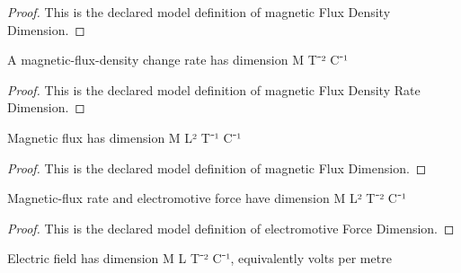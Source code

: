 \begin{proof}
  This is the declared model definition of magnetic Flux Density Dimension.
\end{proof}
\begin{definition}
  \label{def:physics:phyx-mini-0938:phyxminiproblems-problemphyxmini0938-magneticfluxdensityratedimension}
  A magnetic-flux-density change rate has dimension M T⁻² C⁻¹
\end{definition}
\begin{proof}
  This is the declared model definition of magnetic Flux Density Rate Dimension.
\end{proof}
\begin{definition}
  \label{def:physics:phyx-mini-0938:phyxminiproblems-problemphyxmini0938-magneticfluxdimension}
  Magnetic flux has dimension M L² T⁻¹ C⁻¹
\end{definition}
\begin{proof}
  This is the declared model definition of magnetic Flux Dimension.
\end{proof}
\begin{definition}
  \label{def:physics:phyx-mini-0938:phyxminiproblems-problemphyxmini0938-electromotiveforcedimension}
  Magnetic-flux rate and electromotive force have dimension M L² T⁻² C⁻¹
\end{definition}
\begin{proof}
  This is the declared model definition of electromotive Force Dimension.
\end{proof}
\begin{definition}
  \label{def:physics:phyx-mini-0938:phyxminiproblems-problemphyxmini0938-electricfielddimension}
  Electric field has dimension M L T⁻² C⁻¹, equivalently volts per metre
\end{definition}
